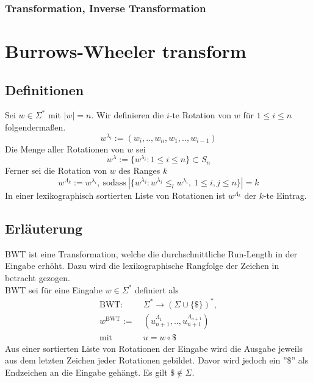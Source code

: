 \documentclass{article}
\begin{document}
\subsubsection{Transformation, Inverse Transformation}

\newpage
\section{Burrows-Wheeler transform}
\subsection{Definitionen}
Sei $w\in\Sigma^*$ mit $|w|=n$. Wir definieren die $i$-te Rotation von $w$ für $1\leq i\leq n$ folgendermaßen.
\begin{equation}
    w^{\lambda_i}:=(w_i,..,w_n,w_1,..,w_{i-1})
\end{equation}
Die Menge aller Rotationen von $w$ sei
\begin{equation}
    w^\lambda:=\{w^{\lambda_i}:1\leq i\leq n\}\subset S_n
\end{equation}
Ferner sei die Rotation von $w$ des Ranges $k$
\begin{equation}
    w^{\Lambda_k}:=w^{\lambda_i},~\text{sodass}~|\{w^{\lambda_j}:w^{\lambda_j}\leq_l w^{\lambda_i},~1\leq i,j\leq n\}|=k
\end{equation}
In einer lexikographisch sortierten Liste von Rotationen ist $w^{\Lambda_k}$ der $k$-te Eintrag.
\subsection{Erläuterung}
BWT ist eine Transformation, welche die durchschnittliche Run-Length in der Eingabe erhöht. Dazu wird die lexikographische Rangfolge der Zeichen in betracht gezogen.
\\[.5cm]
BWT sei für eine Eingabe $w\in\Sigma^*$ definiert als
\begin{equation}
\begin{split}
    \text{BWT}:~&\Sigma^*\rightarrow(\Sigma\cup\{\$\})^*,\\
    w^\text{BWT}:=~&(u^{\Lambda_1}_{n+1},..,u^{\Lambda_{n+1}}_{n+1})\\
    \text{mit}~&u=w\circ\$
\end{split}
\end{equation}
Aus einer sortierten Liste von Rotationen der Eingabe wird die Ausgabe jeweils aus dem letzten Zeichen jeder Rotationen gebildet. Davor wird jedoch ein ''\$'' als Endzeichen an die Eingabe gehängt. Es gilt $\$\not\in\Sigma$.
\end{document}
